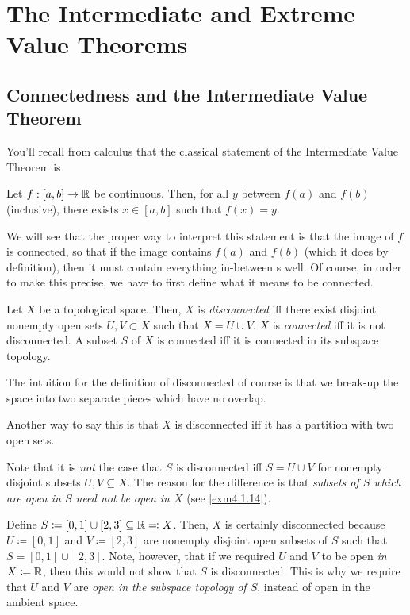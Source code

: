 \section{The Intermediate and Extreme Value Theorems}

\subsection{Connectedness and the Intermediate Value Theorem}

You'll recall from calculus that the classical statement of the Intermediate Value Theorem is
\begin{footnoteequation}
\begin{textequation}
Let $f:[a,b]\rightarrow \mathbb{R}$ be continuous.  Then, for all $y$ between $f(a)$ and $f(b)$ (inclusive), there exists $x\in [a,b]$ such that $f(x)=y$.
\end{textequation}
\end{footnoteequation}
We will see that the proper way to interpret this statement is that the image of $f$ is connected, so that if the image contains $f(a)$ and $f(b)$ (which it does by definition), then it must contain everything in-between s well.  Of course, in order to make this precise, we have to first define what it means to be connected.
\begin{dfn}\label{Connected}
Let $X$ be a topological space.  Then, $X$ is \emph{disconnected} iff there exist disjoint nonempty open sets $U,V\subset X$ such that $X=U\cup V$.  $X$ is \emph{connected} iff it is not disconnected.  A subset $S$ of $X$ is connected iff it is connected in its subspace topology.
\begin{rmk}
The intuition for the definition of disconnected of course is that we break-up the space into two separate pieces which have no overlap.
\end{rmk}
\begin{rmk}
Another way to say this is that $X$ is disconnected iff it has a partition with two open sets.
\end{rmk}
\begin{rmk}
Note that it is \emph{not} the case that $S$ is disconnected iff $S=U\cup V$ for nonempty disjoint subsets $U,V\subseteq X$.  The reason for the difference is that \emph{subsets of $S$ which are open in $S$ need not be open in $X$} (see \cref{exm4.1.14}).
\end{rmk}
\end{dfn}
\begin{exm}
Define $S\coloneqq [0,1]\cup [2,3]\subseteq \mathbb{R} \eqqcolon X$.  Then, $X$ is certainly disconnected because $U\coloneqq [0,1]$ and $V\coloneqq [2,3]$ are nonempty disjoint open subsets of $S$ such that $S=[0,1]\cup [2,3]$.  Note, however, that if we required $U$ and $V$ to be open \emph{in $X\coloneqq \mathbb{R}$}, then this would not show that $S$ is disconnected.  This is why we require that $U$ and $V$ are \emph{open in the subspace topology of $S$}, instead of open in the ambient space.
\end{exm}
